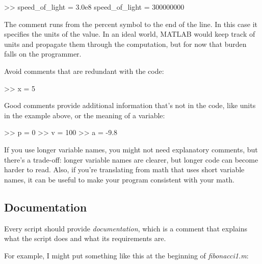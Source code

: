 \documentclass[../../book.tex]{subfiles}
\begin{document}

\begin{code}
>> speed_of_light = 3.0e8     %
speed_of_light = 300000000
\end{code}

The comment runs from the percent symbol to the end of the line.
In this case it specifies the units of the value.  In an ideal world,
MATLAB would keep track of units and propagate them through the
computation, but for now that burden falls on the programmer.


Avoid comments that are redundant with the code:

\begin{code}
>> x = 5        %
\end{code}

Good comments provide additional information that's not in the
code, like units in the example above, or the meaning of a variable:

\begin{code}
>> p = 0         %
>> v = 100       %
>> a = -9.8      %
\end{code}

If you use longer variable names, you might not need explanatory
comments, but there's a trade-off: longer variable names are clearer, but longer code can become harder
to read.
Also, if you're translating from math
that uses short variable names, it can be useful to make your
program consistent with your math.


\subsection{Documentation}

Every script should provide \emph{documentation}, which is a comment
that explains what the script does and what its requirements are.

For example, I might put something like this at the beginning of \emph{fibonacci1.m}:


\begin{code}
\end{code}
\end{document}
